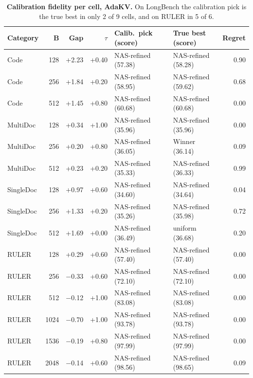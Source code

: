 \begin{table}[t]
  \centering
  \footnotesize
  \setlength{\tabcolsep}{4pt}
  \begin{tabular}{@{}l r r r l l r@{}}
    \toprule
    Category & B & Gap & $\tau$ & Calib.\ pick (score) & True best (score) & Regret \\
    \midrule
    Code & 128 & +2.23 & +0.40 & NAS-refined (57.38) & NAS-refined (58.28) & 0.90 \\
    Code & 256 & +1.84 & +0.20 & NAS-refined (58.95) & NAS-refined (59.62) & 0.68 \\
    Code & 512 & +1.45 & +0.80 & NAS-refined (60.68) & NAS-refined (60.68) & 0.00 \\
    MultiDoc & 128 & +0.34 & +1.00 & NAS-refined (35.96) & NAS-refined (35.96) & 0.00 \\
    MultiDoc & 256 & +0.20 & +0.80 & NAS-refined (36.05) & Winner (36.14) & 0.09 \\
    MultiDoc & 512 & +0.23 & +0.20 & NAS-refined (35.33) & NAS-refined (36.33) & 0.99 \\
    SingleDoc & 128 & +0.97 & +0.60 & NAS-refined (34.60) & NAS-refined (34.64) & 0.04 \\
    SingleDoc & 256 & +1.33 & +0.20 & NAS-refined (35.26) & NAS-refined (35.98) & 0.72 \\
    SingleDoc & 512 & +1.69 & +0.00 & NAS-refined (36.49) & uniform (36.68) & 0.20 \\
    RULER & 128 & +0.29 & +0.60 & NAS-refined (57.40) & NAS-refined (57.40) & 0.00 \\
    RULER & 256 & $-$0.33 & +0.60 & NAS-refined (72.10) & NAS-refined (72.10) & 0.00 \\
    RULER & 512 & $-$0.12 & +1.00 & NAS-refined (83.08) & NAS-refined (83.08) & 0.00 \\
    RULER & 1024 & $-$0.70 & +1.00 & NAS-refined (93.78) & NAS-refined (93.78) & 0.00 \\
    RULER & 1536 & $-$0.19 & +0.80 & NAS-refined (97.99) & NAS-refined (97.99) & 0.00 \\
    RULER & 2048 & $-$0.14 & +0.60 & NAS-refined (98.56) & NAS-refined (98.65) & 0.09 \\
    \bottomrule
  \end{tabular}
  \caption{\textbf{Calibration fidelity per cell, AdaKV.} On LongBench the calibration pick is the true best in only 2 of 9 cells, and on RULER in 5 of 6.}
  \label{tab:app-calib-adakv}
\end{table}


